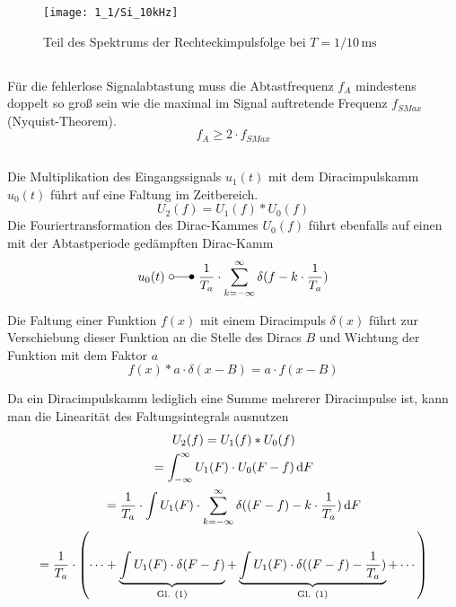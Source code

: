 \documentclass[a4paper, 12pt]{article}
\begin{document}
\begin{figure}[H]
	\texttt{[image: 1\_1/Si\_10kHz]}
  \caption{Teil des Spektrums der Rechteckimpulsfolge bei $T=1/10\,\si{\milli\second}$}
\end{figure}

\subsection{}
Für die fehlerlose Signalabtastung muss die Abtastfrequenz $f_A$ mindestens
doppelt so groß sein wie die maximal im Signal auftretende Frequenz $f_{SMax}$ (Nyquist-Theorem).
\[
  f_A \geq 2\cdot f_{SMax}
\]


\subsection{}

Die Multiplikation des Eingangssignals $u_1(t)$ mit dem Diracimpulskamm $u_0(t)$
führt auf eine Faltung im Zeitbereich.
\[
U_2(f) = U_1(f) * U_0(f)
\]
Die Fouriertransformation des Dirac-Kammes $U_0(f)$
führt ebenfalls auf einen mit der Abtastperiode gedämpften Dirac-Kamm
\[
  u_0(t) \,\, \laplace \,\, \frac{1}{T_a} \cdot \sum_{k=-\infty}^{\infty}{\delta{(f - k
      \cdot \frac{1}{T_a})}}
\]

Die Faltung einer Funktion $f(x)$ mit einem Diracimpuls $\delta(x)$ führt zur Verschiebung dieser
Funktion an die Stelle des Diracs $B$ und Wichtung der Funktion mit dem Faktor $a$
\begin{equation}
\label{eq:1}
  f(x) * a \cdot \delta(x - B) = a \cdot f(x - B)
\end{equation}

Da ein Diracimpulskamm lediglich eine Summe mehrerer Diracimpulse ist, kann man
die Linearität des Faltungsintegrals ausnutzen
\begin{gather*}
  U_2(f) = U_1(f) * U_0(f)\\
  = \int_{-\infty}^{\infty}{U_1(F) \cdot U_0(F - f) \mathop{}\!\mathrm{d} F}\\  
  = \frac{1}{T_a} \cdot \int{U_1(F) \cdot \sum_{k=-\infty}^{\infty}{\delta((F-f) - k
      \cdot \frac{1}{T_a})} \mathop{}\!\mathrm{d}F }\\
  = \frac{1}{T_a} \cdot \left( \cdots + \underbrace{
      \int{U_1(F) \cdot \delta{(F-f)}}
    }_{\textrm{Gl. } (1)}
    +
    \underbrace{
      \int{U_1(F) \cdot \delta{((F-f) - \frac{1}{T_a})}}
      }_{\textrm{Gl. } (1)}
      + \cdots \right)
\end{gather*}
\end{document}
